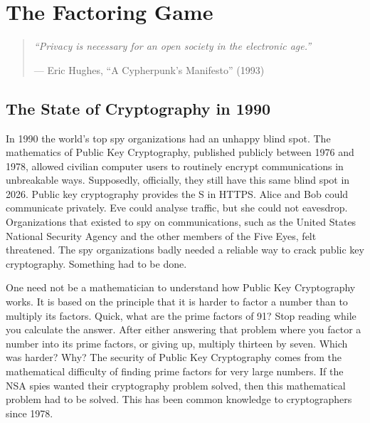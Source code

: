 
\chapter{The Factoring Game}
\label{spine:factoring-game}


\begin{quote}\small
\textit{``Privacy is necessary for an open society in the electronic age.''}

\hfill --- Eric Hughes, ``A Cypherpunk's Manifesto'' (1993)
\end{quote}

\vspace{0.5cm}


\section*{The State of Cryptography in 1990}
\label{spine:fg-the-state-of-cryptography-in-1990}


In 1990 the world's top spy organizations had an unhappy blind spot.  The mathematics of Public Key Cryptography, published publicly between 1976 and 1978, allowed civilian computer users to routinely encrypt communications in unbreakable ways.  Supposedly, officially, they still have this same blind spot in 2026.  Public key cryptography provides the S in HTTPS.  Alice and Bob could communicate privately.  Eve could analyse traffic, but she could not eavesdrop.  Organizations that existed to spy on communications, such as the United States National Security Agency and the other members of the Five Eyes, felt threatened.  The spy organizations badly needed a reliable way to crack public key cryptography. Something had to be done.

One need not be a mathematician to understand how Public Key Cryptography works.  It is based on the principle that it is harder to factor a number than to multiply its factors.  Quick, what are the prime factors of 91?  Stop reading while you calculate the answer.  After either answering that problem where you factor a number into its prime factors, or giving up, multiply thirteen by seven.  Which was harder?  Why?  The security of Public Key Cryptography comes from the mathematical difficulty of finding prime factors for very large numbers.  If the NSA spies wanted their cryptography problem solved, then this mathematical problem had to be solved.  This has been common knowledge to cryptographers since 1978.

